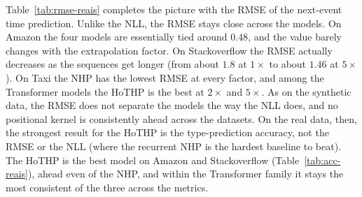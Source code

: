 Table~\ref{tab:rmse-reais} completes the picture with the RMSE of the next-event time prediction. Unlike the NLL, the RMSE stays close across the models. On Amazon the four models are essentially tied around $0.48$, and the value barely changes with the extrapolation factor. On Stackoverflow the RMSE actually decreases as the sequences get longer (from about $1.8$ at $1\times$ to about $1.46$ at $5\times$). On Taxi the NHP has the lowest RMSE at every factor, and among the Transformer models the HoTHP is the best at $2\times$ and $5\times$. As on the synthetic data, the RMSE does not separate the models the way the NLL does, and no positional kernel is consistently ahead across the datasets. On the real data, then, the strongest result for the HoTHP is the type-prediction accuracy, not the RMSE or the NLL (where the recurrent NHP is the hardest baseline to beat). The HoTHP is the best model on Amazon and Stackoverflow (Table~\ref{tab:acc-reais}), ahead even of the NHP, and within the Transformer family it stays the most consistent of the three across the metrics.

